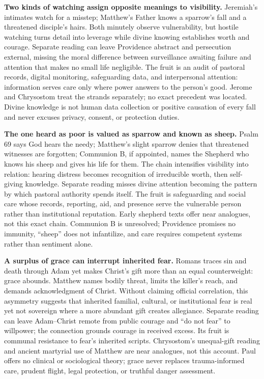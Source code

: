 \begin{deepstudy}
\noindent\textbf{Two kinds of watching assign opposite meanings to visibility.\enspace{}}
Jeremiah's intimates watch for a misstep; Matthew's Father knows a sparrow's fall and a threatened disciple's hairs. Both minutely observe vulnerability, but hostile watching turns detail into leverage while divine knowing establishes worth and courage. Separate reading can leave Providence abstract and persecution external, missing the moral difference between surveillance awaiting failure and attention that makes no small life negligible. The fruit is an audit of pastoral records, digital monitoring, safeguarding data, and interpersonal attention: information serves care only where power answers to the person's good. Jerome and Chrysostom treat the strands separately; no exact precedent was located. Divine knowledge is not human data collection or positive causation of every fall and never excuses privacy, consent, or protection duties.

\noindent\textbf{The one heard as poor is valued as sparrow and known as sheep.\enspace{}}
Psalm 69 says God hears the needy; Matthew's slight sparrow denies that threatened witnesses are forgotten; Communion B, if appointed, names the Shepherd who knows his sheep and gives his life for them. The chain intensifies visibility into relation: hearing distress becomes recognition of irreducible worth, then self-giving knowledge. Separate reading misses divine attention becoming the pattern by which pastoral authority spends itself. The fruit is safeguarding and social care whose records, reporting, aid, and presence serve the vulnerable person rather than institutional reputation. Early shepherd texts offer near analogues, not this exact chain. Communion B is unresolved; Providence promises no immunity, “sheep” does not infantilize, and care requires competent systems rather than sentiment alone.

\noindent\textbf{A surplus of grace can interrupt inherited fear.\enspace{}}
Romans traces sin and death through Adam yet makes Christ's gift more than an equal counterweight: grace abounds. Matthew names bodily threat, limits the killer's reach, and demands acknowledgment of Christ. Without claiming official correlation, this asymmetry suggests that inherited familial, cultural, or institutional fear is real yet not sovereign where a more abundant gift creates allegiance. Separate reading can leave Adam--Christ remote from public courage and “do not fear” to willpower; the connection grounds courage in received excess. Its fruit is communal resistance to fear's inherited scripts. Chrysostom's unequal-gift reading and ancient martyrial use of Matthew are near analogues, not this account. Paul offers no clinical or sociological theory; grace never replaces trauma-informed care, prudent flight, legal protection, or truthful danger assessment.


\end{deepstudy}
